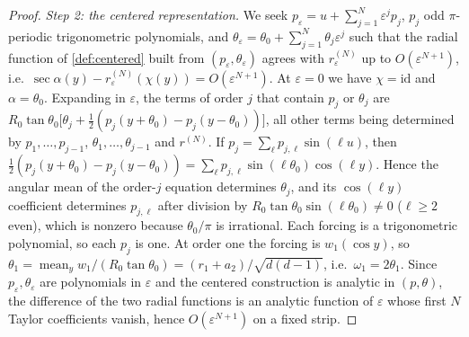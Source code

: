 \documentclass[11pt]{amsart}
\numberwithin{equation}{section}
\theoremstyle{definition}
\theoremstyle{remark}
\newcommand{\eps}{\varepsilon}
\newcommand{\mean}{\operatorname{mean}}
\newcommand{\id}{\mathrm{id}}
\begin{document}
\begin{proof}
\emph{Step 2: the centered representation.} We seek $p_\eps=u+\sum_{j=1}^N\eps^jp_j$, $p_j$ odd $\pi$-periodic trigonometric polynomials, and $\theta_\eps=\theta_0+\sum_{j=1}^N\theta_j\eps^j$ such that the radial function of \cref{def:centered} built from $(p_\eps,\theta_\eps)$ agrees with $r^{(N)}_\eps$ up to $O(\eps^{N+1})$, i.e.\ $\sec\alpha(y)-r^{(N)}_\eps(\chi(y))=O(\eps^{N+1})$. At $\eps=0$ we have $\chi=\id$ and $\alpha=\theta_0$. Expanding in $\eps$, the terms of order $j$ that contain $p_j$ or $\theta_j$ are $R_0\tan\theta_0\bigl[\theta_j+\frac12(p_j(y+\theta_0)-p_j(y-\theta_0))\bigr]$, all other terms being determined by $p_1,\dots,p_{j-1}$, $\theta_1,\dots,\theta_{j-1}$ and $r^{(N)}$. If $p_j=\sum_{\ell}p_{j,\ell}\sin(\ell u)$, then $\frac12(p_j(y+\theta_0)-p_j(y-\theta_0))=\sum_\ell p_{j,\ell}\sin(\ell\theta_0)\cos(\ell y)$. Hence the angular mean of the order-$j$ equation determines $\theta_j$, and its $\cos(\ell y)$ coefficient determines $p_{j,\ell}$ after division by $R_0\tan\theta_0\sin(\ell\theta_0)\ne0$ ($\ell\ge2$ even), which is nonzero because $\theta_0/\pi$ is irrational. Each forcing is a trigonometric polynomial, so each $p_j$ is one. At order one the forcing is $w_1(\cos y)$, so $\theta_1=\mean_y w_1/(R_0\tan\theta_0)=(r_1+a_2)/\sqrt{d(d-1)}$, i.e.\ $\omega_1=2\theta_1$. Since $p_\eps,\theta_\eps$ are polynomials in $\eps$ and the centered construction is analytic in $(p,\theta)$, the difference of the two radial functions is an analytic function of $\eps$ whose first $N$ Taylor coefficients vanish, hence $O(\eps^{N+1})$ on a fixed strip.


\end{proof}
\end{document}
